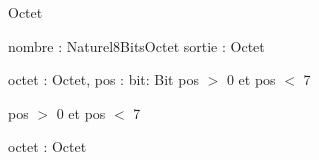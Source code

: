 \begin{algorithme}
\begin{enregistrement}{Octet}{
}
\end{enregistrement}

    {nombre : Naturel8Bits}{Octet}
    {}{sortie : Octet}
{
}

    {octet : Octet, pos : \naturelNonNul}{bit: Bit}
    {pos $>$ 0 et pos $<$ 7}{}
{
}

    {pos $>$ 0 et pos $<$ 7}{}
{
}

    {octet : Octet}{\naturel}
    {}{}
{   
}

\end{algorithme}
